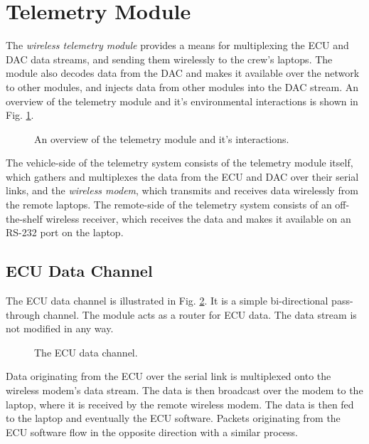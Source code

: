 \section{Telemetry Module\label{sec:Telemetry-Module-Design}}

The \emph{wireless telemetry module} provides a means for multiplexing the ECU and DAC data streams, and sending them wirelessly to the crew's laptops. The module also decodes data from the DAC and makes it available over the network to other modules, and injects data from other modules into the DAC stream. An overview of the telemetry module and it's environmental interactions is shown in Fig. \ref{fig:design_telemetry_overview_block}.

\begin{figure}[H]
	\centering
%	
	\caption{An overview of the telemetry module and it's interactions.}
	\label{fig:design_telemetry_overview_block}
\end{figure}

The vehicle-side of the telemetry system consists of the telemetry module itself, which gathers and multiplexes the data from the ECU and DAC over their serial links, and the \emph{wireless modem}, which transmits and receives data wirelessly from the remote laptops. The remote-side of the telemetry system consists of an off-the-shelf wireless receiver, which receives the data and makes it available on an RS-232 port on the laptop.

\subsection{ECU Data Channel}

The ECU data channel is illustrated in Fig. \ref{fig:ecu_data_channel}. It is a simple bi-directional pass-through channel. The module acts as a router for ECU data. The data stream is not modified in any way. 

\begin{figure}[H]
	\centering
%	
	\caption{The ECU data channel.}
	\label{fig:ecu_data_channel}
\end{figure}

Data originating from the ECU over the serial link is multiplexed onto the wireless modem's data stream. The data is then broadcast over the modem to the laptop, where it is received by the remote wireless modem. The data is then fed to the laptop and eventually the ECU software. Packets originating from the ECU software flow in the opposite direction with a similar process.

